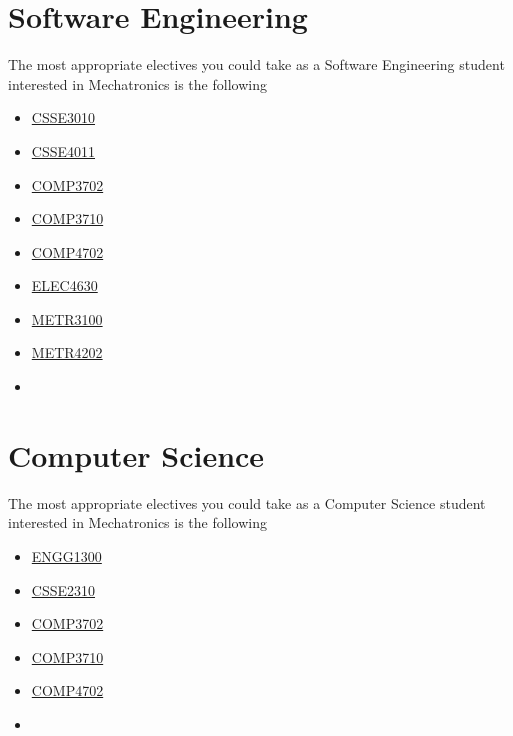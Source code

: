 \section{Software Engineering}
The most appropriate electives you could take as a Software Engineering student interested in Mechatronics is the following
\begin{multicols}{3}
    \begin{itemize}
        \item \hyperlink{CSSE3010}{CSSE3010}
        \item \hyperlink{CCSE4011}{CSSE4011}
        \item \hyperlink{COMP3702}{COMP3702}
        \item \hyperlink{COMP3710}{COMP3710}
        \item \hyperlink{COMP4702}{COMP4702}
        \item \hyperlink{ELEC4630}{ELEC4630}
        \item \hyperlink{METR3100}{METR3100}
        \item \hyperlink{METR4202}{METR4202}
        \item[]
    \end{itemize}
\end{multicols}

\section{Computer Science}
The most appropriate electives you could take as a Computer Science student interested in Mechatronics is the following
\begin{multicols}{3}
    \begin{itemize}
        \item \hyperlink{ENGG1300}{ENGG1300}
        \item \hyperlink{CSSE2310}{CSSE2310}
        \item \hyperlink{COMP3702}{COMP3702}
        \item \hyperlink{COMP3710}{COMP3710}
        \item \hyperlink{COMP4702}{COMP4702}
        \item[]
    \end{itemize}
\end{multicols}

